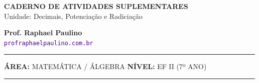 \documentclass[twoside, 10pt, a4paper]{article}
\begin{document}
\thispagestyle{empty}
\color{Cinzablack}
\vspace*{-1.8cm}

\noindent
\begin{minipage}{\textwidth}
    \selectfont
    \noindent
    \begin{minipage}[t]{0.70\linewidth}
        {\Large \bfseries \MakeUppercase{Caderno de Atividades Suplementares}}\\[0.1cm]
        {\large \textmd{\textcolor{CinzaEscuro}{Unidade: Decimais, Potenciação e Radiciação}}}
    \end{minipage}%
    \begin{minipage}[t]{0.30\linewidth}
        \raggedleft
        \small \textbf{Prof. Raphael Paulino}\\
        \textsf{\small \textcolor{indigo}{\texttt{profraphaelpaulino.com.br}}}
    \end{minipage}
    
    \vspace{0.15cm}
    \noindent\rule{\linewidth}{1.2pt}
    \vspace{-0.1cm}
    \footnotesize\textsf{\textbf{ÁREA:} MATEMÁTICA / ÁLGEBRA \hfill \textbf{NÍVEL:} EF II (7º ANO)}
    \vspace{0.1cm}
    \noindent\rule{\linewidth}{0.4pt}
\end{minipage}
\end{document}
